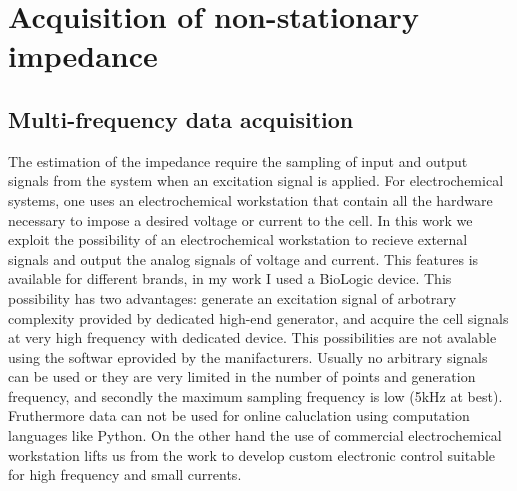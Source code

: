 \chapter{Acquisition of non-stationary impedance}
\minitoc

\section{Multi-frequency data acquisition}
The estimation of the impedance require the sampling of input and output signals from the system when an excitation signal is applied. For electrochemical systems, one uses an electrochemical workstation that contain all the hardware necessary to impose a desired voltage or current to the cell. In this work we exploit the possibility of an electrochemical workstation to recieve external signals and output the analog signals of voltage and current. This features is available for different brands, in my work I used a BioLogic device. This possibility has two advantages: generate an excitation signal of arbotrary complexity provided by dedicated high-end generator, and acquire the cell signals at very high frequency with dedicated device. This possibilities are not avalable using the softwar eprovided by the manifacturers. Usually no arbitrary signals can be used or they are very limited in the number of points and generation frequency, and secondly the maximum sampling frequency is low (5kHz at best). Fruthermore data can not be used for online caluclation using computation languages like Python. On the other hand the use of commercial electrochemical workstation lifts us from the work to develop custom electronic control suitable for high frequency and small currents. \\
